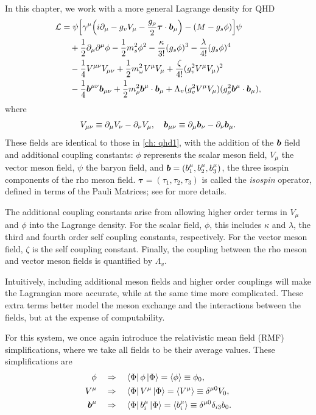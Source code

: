 In this chapter, we work with a more general Lagrange density for QHD
\begin{align}
    \Lag & = \psi \bqty{\gamma^\mu\qty(i\p_\mu -g_vV_\mu - \frac{g_\rho}{2}{\boldsymbol\tau}\cdot {\boldsymbol b}_\mu)-(M-g_s\phi)}\psi\nonumber\\
    & \quad + \frac{1}{2}\p_\mu \p^\mu \phi - \frac{1}{2}m_s^2\phi^2 - \frac{\kappa}{3!}(g_s\phi)^3 - \frac{\lambda}{4!}(g_s\phi)^4 \nonumber\\
    & \quad - \frac{1}{4} V^{\mu\nu}V_{\mu\nu} + \frac{1}{2} m_\omega^2 V^\mu V_\mu + \frac{\zeta}{4!}(g_v^2 V^\mu V_\mu)^2 \nonumber\\
    & \quad - \frac{1}{4} \B^{\mu\nu} \B_{\mu\nu} + \frac{1}{2}m_\rho^2 \B^\mu \cdot \B_\mu + \Lambda_v (g_v^2 V^\mu V_\mu)(g_\rho^2 \B^\mu \cdot \B_\mu),
\end{align}
where
\begin{align*}
    V_{\mu\nu} \equiv \partial_\mu V_\nu - \partial_\nu V_\mu, \quad
    {\boldsymbol b}_{\mu\nu} \equiv \partial_\mu {\boldsymbol b}_\nu - \partial_\nu {\boldsymbol b}_\mu.
\end{align*}
These fields are identical to those in \autoref{ch: qhd1}, with the addition of the ${\boldsymbol b}$ field and additional coupling constants: $\phi$ represents the scalar meson field, $V_\mu$ the vector meson field, $\psi$ the baryon field, and ${\boldsymbol b} = (b^\mu_1, b_2^\mu, b_3^\mu)$, the three isospin components of the rho meson field. ${\boldsymbol\tau} = (\tau_1, \tau_2, \tau_3)$ is called the \textit{isospin} operator, defined in terms of the Pauli Matrices; see \autocite[pp. 72-73]{diener_2008} for more details. 

The additional coupling constants arise from allowing higher order terms in $V_\mu$ and $\phi$ into the Lagrange density. For the scalar field, $\phi$, this includes $\kappa$ and $\lambda$, the third and fourth order self coupling constants, respectively. For the vector meson field, $\zeta$ is the self coupling constant. Finally, the coupling between the rho meson and vector meson fields is quantified by $\Lambda_v$.

Intuitively, including additional meson fields and higher order couplings will make the Lagrangian more accurate, while at the same time more complicated. These extra terms better model the meson exchange and the interactions between the fields, but at the expense of computability.

For this system, we once again introduce the relativistic mean field (RMF) simplifications, where we take all fields to be their average values. These simplifications are
\begin{align}
    \phi &\quad\Rightarrow\quad \bra{\Phi} \phi \ket{\Phi} = \expval{\phi} \equiv \phi_0, \\
    V^\mu & \quad\Rightarrow\quad \bra{\Phi} V^\mu \ket{\Phi} = \expval{V^\mu} \equiv \delta^{\mu 0} V_0,\\
    {\boldsymbol b}^\mu & \quad\Rightarrow\quad \bra{\Phi} b^\mu_i \ket{\Phi} = \expval{b^\mu_i} \equiv \delta^{\mu 0} \delta_{i3} b_0.
\end{align}

